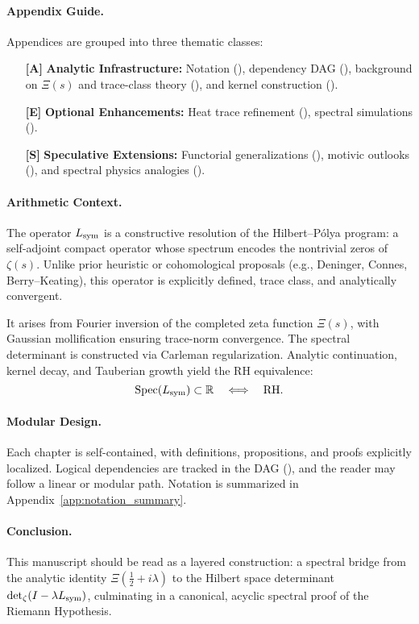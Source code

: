 \paragraph*{Appendix Guide.} Appendices are grouped into three thematic classes:

\begin{itemize}
  \item[\textbf{[A]}] \textbf{Analytic Infrastructure:} Notation (), dependency DAG (), background on \( \Xi(s) \) and trace-class theory (), and kernel construction ().
  
  \item[\textbf{[E]}] \textbf{Optional Enhancements:} Heat trace refinement (), spectral simulations ().

  \item[\textbf{[S]}] \textbf{Speculative Extensions:} Functorial generalizations (), motivic outlooks (), and spectral physics analogies ().
\end{itemize}

\paragraph*{Arithmetic Context.} The operator \( L_{\mathrm{sym}} \) is a constructive resolution of the Hilbert–Pólya program: a self-adjoint compact operator whose spectrum encodes the nontrivial zeros of \( \zeta(s) \). Unlike prior heuristic or cohomological proposals (e.g., Deninger, Connes, Berry–Keating), this operator is explicitly defined, trace class, and analytically convergent.

It arises from Fourier inversion of the completed zeta function \( \Xi(s) \), with Gaussian mollification ensuring trace-norm convergence. The spectral determinant is constructed via Carleman regularization. Analytic continuation, kernel decay, and Tauberian growth yield the RH equivalence:
\[
\operatorname{Spec}(L_{\mathrm{sym}}) \subset \mathbb{R} \quad \Longleftrightarrow \quad \text{RH}.
\]

\paragraph*{Modular Design.} Each chapter is self-contained, with definitions, propositions, and proofs explicitly localized. Logical dependencies are tracked in the DAG (), and the reader may follow a linear or modular path. Notation is summarized in Appendix~\ref{app:notation_summary}.

\paragraph*{Conclusion.} This manuscript should be read as a layered construction: a spectral bridge from the analytic identity \( \Xi(\tfrac{1}{2}+i\lambda) \) to the Hilbert space determinant \( \det\nolimits_{\zeta}(I - \lambda L_{\mathrm{sym}}) \), culminating in a canonical, acyclic spectral proof of the Riemann Hypothesis.
